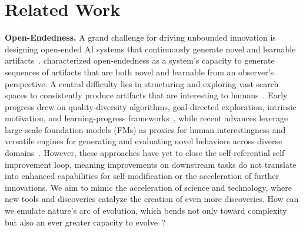 \section{Related Work}
\label{sec:related}

\textbf{Open-Endedness.}
A grand challenge for driving unbounded innovation is designing open-ended AI systems that continuously generate novel and learnable artifacts~\citep{stanley2017open}. \citet{hughes2024open} characterized open-endedness as a system's capacity to generate sequences of artifacts that are both novel and learnable from an observer's perspective. A central difficulty lies in structuring and exploring vast search spaces to consistently produce artifacts that are interesting to humans~\citep{clune2019ai, jiang2023general}. Early progress drew on quality-diversity algorithms, goal-directed exploration, intrinsic motivation, and learning-progress frameworks~\citep{pugh2016quality, ecoffet2019go, lehman2011novelty, oudeyer2007intrinsic}, while recent advances leverage large-scale foundation models (FMs) as proxies for human interestingness and versatile engines for generating and evaluating novel behaviors across diverse domains~\citep{brown2020language, hu2025automated, zhang2024omni}. However, these approaches have yet to close the self-referential self-improvement loop, meaning improvements on downstream tasks do not translate into enhanced capabilities for self-modification or the acceleration of further innovations. We aim to mimic the acceleration of science and technology, where new tools and discoveries catalyze the creation of even more discoveries. How can we emulate nature's arc of evolution, which bends not only toward complexity but also an ever greater capacity to evolve~\citep{dawkins2019evolution, gerhart2007theory, hendrikse2007evolvability}?

